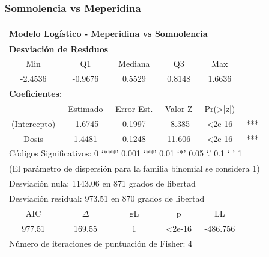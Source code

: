 \documentclass[10pt]{beamer}
\begin{document}
	
	\begin{frame}
		\frametitle{Somnolencia vs Meperidina}
		
		\begin{table}[]
\centering
\small
\begin{tabular}{|c|c|c|c|c|c|}	
\hline
\multicolumn{6}{|l|}{\textbf{Modelo Logístico - Meperidina vs Somnolencia}}                    \\ \hline
\multicolumn{6}{|l|}{\textbf{{Desviación de Residuos}}}                                        \\ \hline
Min          & Q1       & Mediana    & Q3               & Max                   &              \\ \hline
-2.4536      & -0.9676  & 0.5529     & 0.8148           & 1.6636                &              \\ \hline
\multicolumn{6}{|l|}{\textbf{Coeficientes}:}                                                   \\ \hline
 & Estimado & Error Est. & Valor Z          & Pr(\textgreater{}|z|) &              \\ \hline
(Intercepto) & -1.6745  & 0.1997     & -8.385           & \textless{}2e-16      & ***          \\ \hline
Dosis        & 1.4481   & 0.1248     & 11.606           & \textless{}2e-16      & ***          \\ \hline
\multicolumn{6}{|l|}{Códigos Significativos:  0 ‘***’ 0.001 ‘**’ 0.01 ‘*’  0.05 ‘.’ 0.1 ‘ ’ 1} \\ \hline
\multicolumn{6}{|l|}{(El parámetro de dispersión para la familia binomial se considera 1)}     \\ \hline
\multicolumn{6}{|l|}{Desviación nula: 1143.06 en 871 grados de libertad}                       \\ \hline
\multicolumn{6}{|l|}{Desviación residual: 973.51 en 870 grados de libertad}                    \\ \hline
AIC          & $\Delta$ & gL         & p                & LL                    &              \\ \hline
977.51       & 169.55   & 1          & \textless{}2e-16 & -486.756              &              \\ \hline
\multicolumn{6}{|l|}{Número de iteraciones de puntuación de Fisher: 4}                         \\ \hline
	\end{tabular}
\end{table}
	\end{frame}
	
\end{document}

